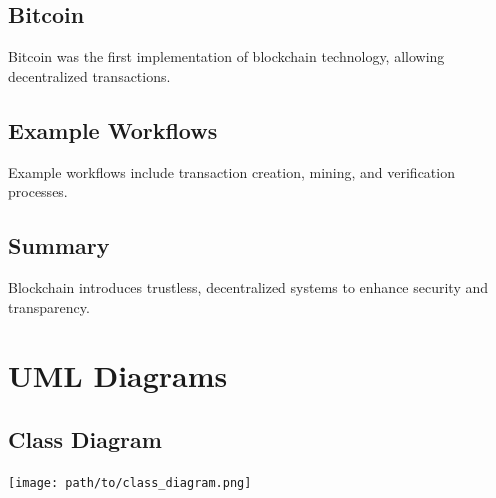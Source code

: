 \documentclass[12pt,a4paper]{report}
\begin{document}
\section{Bitcoin}
Bitcoin was the first implementation of blockchain technology, allowing decentralized transactions.

\section{Example Workflows}
Example workflows include transaction creation, mining, and verification processes.

\section{Summary}
Blockchain introduces trustless, decentralized systems to enhance security and transparency.


\chapter{UML Diagrams}
\section{Class Diagram}
\texttt{[image: path/to/class\_diagram.png]}
\end{document}

